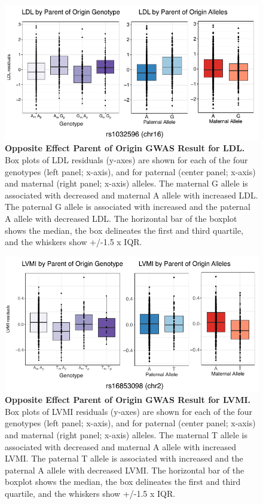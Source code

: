 \begin{figure}[!htb]
\centering
\includegraphics[width=5in]{img/ch02/fig-s8.pdf}
\caption[Opposite Effect Parent of Origin GWAS Result for LDL.]{\textbf{Opposite Effect Parent of Origin GWAS Result for LDL.}  Box plots of LDL residuals (y-axes) are shown for each of the four genotypes (left panel; x-axis), and for paternal (center panel; x-axis) and maternal (right panel; x-axis) alleles. The maternal G allele is associated with decreased and maternal A allele with increased LDL. The paternal G allele is associated with increased and the paternal A allele with decreased LDL. The horizontal bar of the boxplot shows the median, the box delineates the first and third quartile, and the whiskers show +/-1.5 x IQR.}
\label{fig:fig-s8}
\end{figure}

\begin{figure}[!htb]
\centering
\includegraphics[width=5in]{img/ch02/fig-s9.pdf}
\caption[Opposite Effect Parent of Origin GWAS Result for LVMI.]{\textbf{Opposite Effect Parent of Origin GWAS Result for LVMI.}  Box plots of LVMI residuals (y-axes) are shown for each of the four genotypes (left panel; x-axis), and for paternal (center panel; x-axis) and maternal (right panel; x-axis) alleles. The maternal T allele is associated with decreased and maternal A allele with increased LVMI. The paternal T allele is associated with increased and the paternal A allele with decreased LVMI. The horizontal bar of the boxplot shows the median, the box delineates the first and third quartile, and the whiskers show +/-1.5 x IQR.}
\label{fig:fig-s9}
\end{figure}

